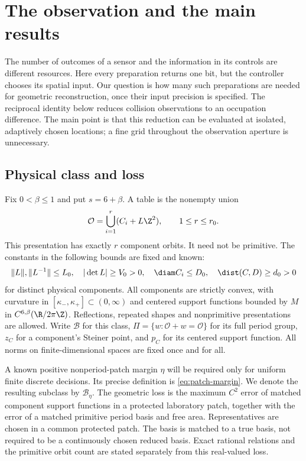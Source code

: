 \section{The observation and the main results}
\label{sec:setting}
The number of outcomes of a sensor and the information in its controls
are different resources. Here every preparation returns one bit, but
the controller chooses its spatial input. Our question is how many such
preparations are needed for geometric reconstruction, once their input
precision is specified. The reciprocal identity below reduces collision
observations to an occupation difference. The main point is that this
reduction can be evaluated at isolated, adaptively chosen locations;
a fine grid throughout the observation aperture is unnecessary.

\subsection{Physical class and loss}
Fix $0<\beta\le1$ and put $s=6+\beta$. A table is the nonempty union
\begin{equation}\label{eq:presentation}
 \mathcal O=\bigcup_{i=1}^r(C_i+L\Z^2),\qquad 1\le r\le r_0.
\end{equation}
This presentation has exactly $r$ component orbits. It need not be
primitive. The constants in the following bounds are fixed and known:
\begin{equation}\label{eq:priors}
 \|L\|,\|L^{-1}\|\le L_0,\quad |\det L|\ge V_0>0,\quad
 \diam C_i\le D_0,\quad \dist(C,D)\ge d_0>0
\end{equation}
for distinct physical components. All components are strictly convex,
with curvature in $[\kappa_-,\kappa_+]\subset(0,\infty)$ and centered
support functions bounded by $M$ in $C^{6,\beta}(\R/2\pi\Z)$.
Reflections, repeated shapes and nonprimitive presentations are allowed.
Write $\mathcal B$ for this class, $\Pi=\{w:\mathcal O+w=\mathcal O\}$
for its full period group, $z_C$ for a component's Steiner point, and
$p_C$ for its centered support function. All norms on finite-dimensional
spaces are fixed once and for all.

A known positive nonperiod-patch margin $\eta$ will be required only
for uniform finite discrete decisions. Its precise definition is
\eqref{eq:patch-margin}. We denote the resulting subclass by
$\mathcal B_\eta$. The geometric loss is the maximum $C^2$ error of
matched component support functions in a protected laboratory patch,
together with the error of a matched primitive period basis and free
area. Representatives are chosen in a common protected patch. The
basis is matched to a true basis, not required to be a continuously
chosen reduced basis. Exact rational relations and the primitive orbit
count are stated separately from this real-valued loss.

